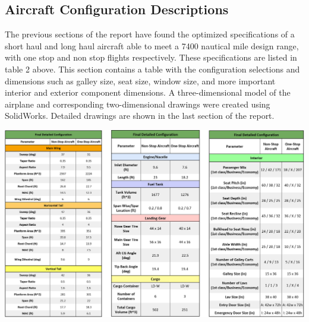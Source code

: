 \documentclass{article}
\begin{document}
    \subsection{Aircraft Configuration Descriptions}
    \label{sec:Configurations}
        \begin{flushleft}
            The previous sections of the report have found the optimized
            specifications of a short haul and long haul aircraft able to meet a
            7400 nautical mile design range, with one stop and non stop flights
            respectively. These specifications are listed in table 2 above. This
            section contains a table with the configuration selections and
            dimensions such as galley size, seat size, window size, and more
            important interior and exterior component dimensions. A
            three-dimensional model of the airplane and corresponding
            two-dimensional drawings were created using SolidWorks. Detailed
            drawings are shown in the last section of the report.
        \end{flushleft}

        \begin{center}
            \includegraphics[scale=0.34]{Final Config.PNG}
            \label{fig:config}
        \end{center}
\end{document}
